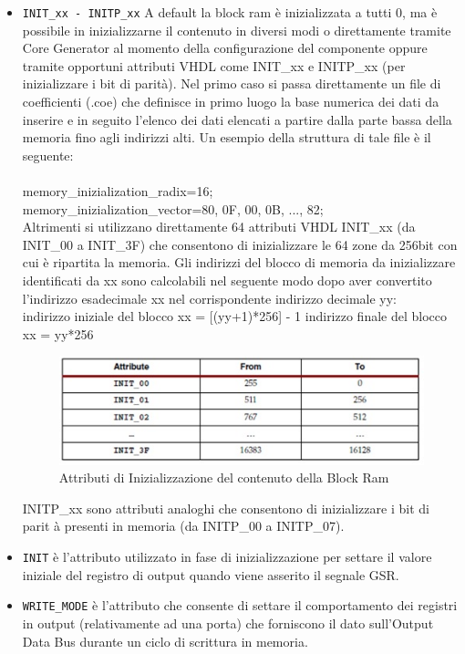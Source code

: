 \begin{itemize}
  \item \texttt{INIT\_xx - INITP\_xx}
A default la block ram \`e inizializzata a tutti 0, ma \`e possibile in inizializzarne il contenuto in diversi modi o direttamente tramite Core Generator al momento della configurazione del componente oppure tramite opportuni attributi VHDL come INIT\_xx e INITP\_xx (per inizializzare i bit di parit\`a). 
Nel primo caso si passa direttamente un file di coefficienti (.coe) che definisce in primo luogo la base numerica dei dati da inserire e in seguito l'elenco dei dati elencati a partire dalla parte bassa della memoria fino agli indirizzi alti. Un esempio della struttura di tale file \`e il seguente:\\\\
	memory\_inizialization\_radix=16;\\
	memory\_inizialization\_vector=80, 0F, 00, 0B, ..., 82;\\

Altrimenti si utilizzano direttamente 64 attributi VHDL INIT\_xx (da INIT\_00 a INIT\_3F) che consentono di inizializzare le 64 zone da 256bit con cui \`e ripartita la memoria. Gli indirizzi del blocco di memoria da inizializzare identificati da xx sono calcolabili nel seguente modo dopo aver convertito l'indirizzo esadecimale xx nel corrispondente indirizzo decimale yy:
\\
indirizzo iniziale del blocco xx = [(yy+1)*256] - 1
indirizzo finale del blocco xx = yy*256
\\
\begin{figure}[!h]
\centering
\includegraphics[width=\textwidth]{img/blockRam/init.jpg}
\caption{Attributi di Inizializzazione del contenuto della Block Ram}
\label{fig:set_ass}
\end{figure}

INITP\_xx sono attributi analoghi che consentono di inizializzare i bit di parit \`a presenti in memoria (da INITP\_00 a INITP\_07).
\item \texttt{INIT}  \`e l'attributo utilizzato in fase di inizializzazione per settare il valore iniziale del registro di output quando viene asserito il segnale GSR.
\\
\item \texttt{WRITE\_MODE}  \`e l'attributo che consente di settare il comportamento dei registri in output (relativamente ad una porta) che forniscono il dato sull'Output Data Bus durante un ciclo di scrittura in memoria.


\end{itemize}
